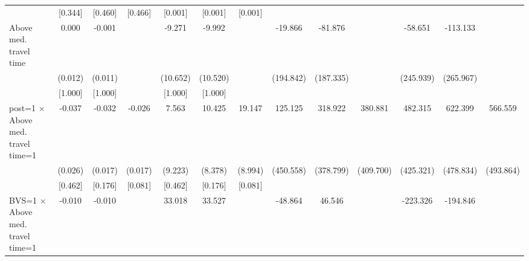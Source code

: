 {\begin{tabular}{l*{12}{c}}
                    &     [0.344]         &     [0.460]         &     [0.466]         &     [0.001]         &     [0.001]         &     [0.001]         &                     &                     &                     &                     &                     &                     \\
Above med. travel time&       0.000         &      -0.001         &                     &      -9.271         &      -9.992         &                     &     -19.866         &     -81.876         &                     &     -58.651         &    -113.133         &                     \\
                    &     (0.012)         &     (0.011)         &                     &    (10.652)         &    (10.520)         &                     &   (194.842)         &   (187.335)         &                     &   (245.939)         &   (265.967)         &                     \\
                    &     [1.000]         &     [1.000]         &                     &     [1.000]         &     [1.000]         &                     &                     &                     &                     &                     &                     &                     \\
post=1 $\times$ Above med. travel time=1&      -0.037         &      -0.032\sym{*}  &      -0.026         &       7.563         &      10.425         &      19.147\sym{**} &     125.125         &     318.922         &     380.881         &     482.315         &     622.399         &     566.559         \\
                    &     (0.026)         &     (0.017)         &     (0.017)         &     (9.223)         &     (8.378)         &     (8.994)         &   (450.558)         &   (378.799)         &   (409.700)         &   (425.321)         &   (478.834)         &   (493.864)         \\
                    &     [0.462]         &     [0.176]         &     [0.081]         &     [0.462]         &     [0.176]         &     [0.081]         &                     &                     &                     &                     &                     &                     \\
BVS=1 $\times$ Above med. travel time=1&      -0.010         &      -0.010         &                     &      33.018\sym{***}&      33.527\sym{***}&                     &     -48.864         &      46.546         &                     &    -223.326         &    -194.846         &                     \\

\end{tabular}}
